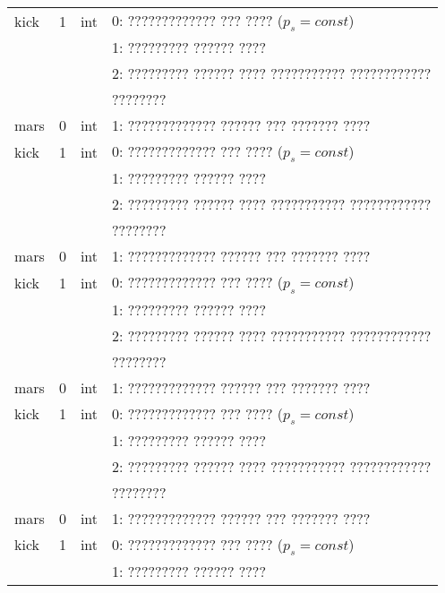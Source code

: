 \begin{longtable}[c]{|l|c|l|l|}
    kick     & 1      & int & 0: ????????????? ??? ???? (\(p_s = const\))       \\
             &        &     & 1: ????????? ?????? ????                          \\
             &        &     & 2: ????????? ?????? ???? ??????????? ???????????? \\
             &        &     & ????????                                          \\
    mars     & 0      & int & 1: ????????????? ?????? ??? ??????? ????          \\
    kick     & 1      & int & 0: ????????????? ??? ???? (\(p_s = const\))       \\
             &        &     & 1: ????????? ?????? ????                          \\
             &        &     & 2: ????????? ?????? ???? ??????????? ???????????? \\
             &        &     & ????????                                          \\
    mars     & 0      & int & 1: ????????????? ?????? ??? ??????? ????          \\
    kick     & 1      & int & 0: ????????????? ??? ???? (\(p_s = const\))       \\
             &        &     & 1: ????????? ?????? ????                          \\
             &        &     & 2: ????????? ?????? ???? ??????????? ???????????? \\
             &        &     & ????????                                          \\
    mars     & 0      & int & 1: ????????????? ?????? ??? ??????? ????          \\
    kick     & 1      & int & 0: ????????????? ??? ???? (\(p_s = const\))       \\
             &        &     & 1: ????????? ?????? ????                          \\
             &        &     & 2: ????????? ?????? ???? ??????????? ???????????? \\
             &        &     & ????????                                          \\
    mars     & 0      & int & 1: ????????????? ?????? ??? ??????? ????          \\
    kick     & 1      & int & 0: ????????????? ??? ???? (\(p_s = const\))       \\
             &        &     & 1: ????????? ?????? ????                          \\

\end{longtable}

